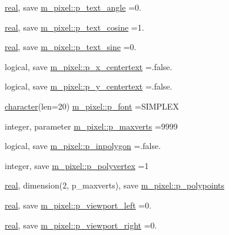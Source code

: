 \begin{DoxyCompactItemize}
\item 
\hyperlink{read__watch_83_8txt_abdb62bde002f38ef75f810d3a905a823}{real}, save \hyperlink{namespacem__pixel_a3b1c231e0814986c5d095cbd4297c816}{m\+\_\+pixel\+::p\+\_\+text\+\_\+angle} =0.
\item 
\hyperlink{read__watch_83_8txt_abdb62bde002f38ef75f810d3a905a823}{real}, save \hyperlink{namespacem__pixel_a85337ee8045620104d3dc7c63cc0cbdb}{m\+\_\+pixel\+::p\+\_\+text\+\_\+cosine} =1.
\item 
\hyperlink{read__watch_83_8txt_abdb62bde002f38ef75f810d3a905a823}{real}, save \hyperlink{namespacem__pixel_afa488842d93c6af90f0acc87f36c8a84}{m\+\_\+pixel\+::p\+\_\+text\+\_\+sine} =0.
\item 
logical, save \hyperlink{namespacem__pixel_afbac34f0dc57e0da0666b52c238ea37c}{m\+\_\+pixel\+::p\+\_\+x\+\_\+centertext} =.false.
\item 
logical, save \hyperlink{namespacem__pixel_a7f2859a8ac00324dff9d055b83bd17d2}{m\+\_\+pixel\+::p\+\_\+y\+\_\+centertext} =.false.
\item 
\hyperlink{option__stopwatch_83_8txt_abd4b21fbbd175834027b5224bfe97e66}{character}(len=20) \hyperlink{namespacem__pixel_a06bbf83bc5125cad5aba0af267af0e18}{m\+\_\+pixel\+::p\+\_\+font} =\textquotesingle{}S\+I\+M\+P\+L\+EX\textquotesingle{}
\item 
integer, parameter \hyperlink{namespacem__pixel_ac1b53fdfda87eb9ede10e72973344e25}{m\+\_\+pixel\+::p\+\_\+maxverts} =9999
\item 
logical, save \hyperlink{namespacem__pixel_a1911f94cdfa5a7c08ff32a696d2ea51e}{m\+\_\+pixel\+::p\+\_\+inpolygon} =.false.
\item 
integer, save \hyperlink{namespacem__pixel_ac0759567a2205be55bc4c9b8b7b6d5d5}{m\+\_\+pixel\+::p\+\_\+polyvertex} =1
\item 
\hyperlink{read__watch_83_8txt_abdb62bde002f38ef75f810d3a905a823}{real}, dimension(2, p\+\_\+maxverts), save \hyperlink{namespacem__pixel_ab5c7f104a86e11630f363a26a1cb7067}{m\+\_\+pixel\+::p\+\_\+polypoints}
\item 
\hyperlink{read__watch_83_8txt_abdb62bde002f38ef75f810d3a905a823}{real}, save \hyperlink{namespacem__pixel_aa5806ca65801efd8c0e6753be81847d6}{m\+\_\+pixel\+::p\+\_\+viewport\+\_\+left} =0.
\item 
\hyperlink{read__watch_83_8txt_abdb62bde002f38ef75f810d3a905a823}{real}, save \hyperlink{namespacem__pixel_a85587aae427d1f08e1f835dc6756b121}{m\+\_\+pixel\+::p\+\_\+viewport\+\_\+right} =0.
\item 

\end{DoxyCompactItemize}
